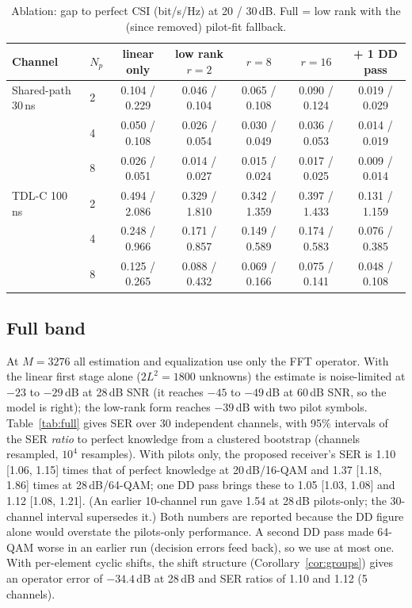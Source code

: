 \begin{table}[!htbp]\centering
\caption{Ablation: gap to perfect CSI (bit/s/Hz) at 20 / 30\,dB. Full = low rank with the (since removed) pilot-fit fallback.}\label{tab:ablation}
\begin{tabular}{llccccc}\toprule
Channel & $N_p$ & linear only & low rank $r=2$ & $r=8$ & $r=16$ & + 1 DD pass \\\midrule
Shared-path 30\,ns & 2 & 0.104 / 0.229 & 0.046 / 0.104 & 0.065 / 0.108 & 0.090 / 0.124 & 0.019 / 0.029 \\
 & 4 & 0.050 / 0.108 & 0.026 / 0.054 & 0.030 / 0.049 & 0.036 / 0.053 & 0.014 / 0.019 \\
 & 8 & 0.026 / 0.051 & 0.014 / 0.027 & 0.015 / 0.024 & 0.017 / 0.025 & 0.009 / 0.014 \\
TDL-C 100\,ns & 2 & 0.494 / 2.086 & 0.329 / 1.810 & 0.342 / 1.359 & 0.397 / 1.433 & 0.131 / 1.159 \\
 & 4 & 0.248 / 0.966 & 0.171 / 0.857 & 0.149 / 0.589 & 0.174 / 0.583 & 0.076 / 0.385 \\
 & 8 & 0.125 / 0.265 & 0.088 / 0.432 & 0.069 / 0.166 & 0.075 / 0.141 & 0.048 / 0.108 \\\bottomrule
\end{tabular}
\end{table}

\subsection{Full band}\label{sec:res-full}
At $M=3276$ all estimation and equalization use only the FFT operator. With the linear
first stage alone ($2L^2=1800$ unknowns) the estimate is noise-limited at $-23$ to $-29$\,dB at
28\,dB SNR (it reaches $-45$ to $-49$\,dB at 60\,dB SNR, so the model is right); the low-rank form
reaches $-39$\,dB with two pilot symbols. Table~\ref{tab:full} gives SER over 30 independent channels, with
95\% intervals of the SER \emph{ratio} to perfect knowledge from a clustered bootstrap (channels resampled,
$10^4$ resamples). With pilots only, the proposed receiver's SER is 1.10 [1.06, 1.15] times that of perfect knowledge
at 20\,dB/16-QAM and 1.37 [1.18, 1.86] times at 28\,dB/64-QAM; one DD pass brings these to 1.05 [1.03, 1.08] and 1.12
[1.08, 1.21]. (An earlier 10-channel run gave 1.54 at 28\,dB pilots-only; the 30-channel interval supersedes it.) Both
numbers are reported because the DD figure alone would overstate the pilots-only performance. A second DD pass made
64-QAM worse in an earlier run (decision errors feed back), so we use at most one. With per-element cyclic shifts, the
shift structure (Corollary~\ref{cor:groups}) gives an operator error of $-34.4$\,dB at 28\,dB and SER ratios of 1.10 and
1.12 (5 channels).

